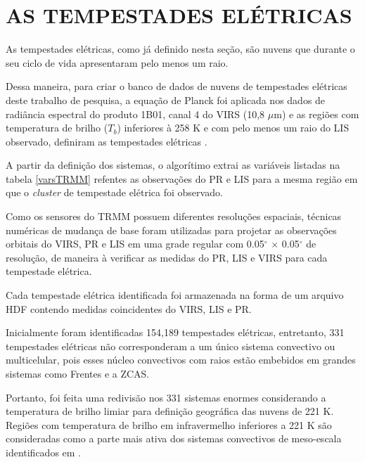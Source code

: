 \section{AS TEMPESTADES ELÉTRICAS}
\label{identificaTempestades}



As tempestades elétricas, como já definido nesta seção, são nuvens que durante o seu ciclo de vida apresentaram pelo menos um raio.

Dessa maneira, para criar o banco de dados de nuvens de tempestades elétricas deste trabalho de pesquisa, a equação de Planck foi aplicada nos dados de radiância espectral do produto 1B01, canal 4 do VIRS (10,8 $\mu$m) e as regiões com temperatura de brilho ($T_b$) inferiores à 258 K e com pelo menos um raio do LIS observado, definiram as tempestades elétricas \cite{morales2003}.


A partir da definição dos sistemas, o algorítimo extrai as variáveis listadas na tabela \ref{varsTRMM} refentes as observações do PR e LIS para a mesma região em que o \textit{cluster} de tempestade elétrica foi observado.

Como os sensores do TRMM possuem diferentes resoluções espaciais, técnicas numéricas de mudança de base foram utilizadas para projetar as observações orbitais do VIRS, PR e LIS em uma grade regular com 0.05$^{\circ}$ $\times$ 0.05$^{\circ}$ de resolução, de maneira à verificar as medidas do PR, LIS e VIRS para cada tempestade elétrica.

Cada tempestade elétrica identificada foi armazenada na forma de um arquivo HDF contendo medidas coincidentes do VIRS, LIS e PR. 

Inicialmente foram identificadas 154,189 tempestades elétricas, entretanto, 331 tempestades elétricas não corresponderam a um único sistema convectivo ou multicelular, pois esses núcleo convectivos com raios estão embebidos em grandes sistemas como Frentes e a ZCAS. 

Portanto, foi feita uma redivisão nos 331 sistemas enormes considerando a temperatura de brilho limiar para definição geográfica das nuvens de 221 K. Regiões com temperatura de brilho em infravermelho inferiores a 221 K são consideradas como a parte mais ativa dos sistemas convectivos de meso-escala identificados em . 


